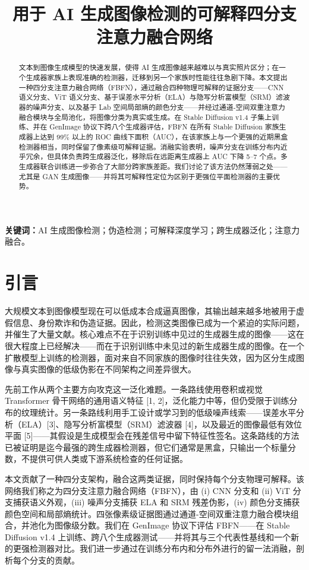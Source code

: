 \documentclass[11pt]{ctexart}
\title{\bfseries 用于 AI 生成图像检测的可解释四分支注意力融合网络}
\date{}
\begin{document}
\maketitle

\begin{abstract}
文本到图像生成模型的快速发展，使得 AI 生成图像越来越难以与真实照片区分；在一个生成器家族上表现准确的检测器，迁移到另一个家族时性能往往急剧下降。本文提出一种四分支注意力融合网络（FBFN），通过融合四种物理可解释的证据分支——CNN 语义分支、ViT 语义分支、基于误差水平分析（ELA）与隐写分析富模型（SRM）滤波器的噪声分支、以及基于 Lab 空间局部熵的颜色分支——并经过通道-空间双重注意力融合模块与全局池化，将图像分类为真实或生成。在 Stable Diffusion v1.4 子集上训练、并在 GenImage 协议下跨八个生成器评估，FBFN 在所有 Stable Diffusion 家族生成器上达到 99\% 以上的 ROC 曲线下面积（AUC），在该家族上与一个更强的近期黑盒检测器相当，同时保留了像素级可解释证据。消融实验表明，噪声分支在训练分布内近乎冗余，但具体负责跨生成器泛化，移除后在远距离生成器上 AUC 下降 5--7 个点。多生成器联合训练进一步弥合了大部分跨家族差距。我们讨论了该方法仍然薄弱之处——尤其是 GAN 生成图像——并将其可解释性定位为区别于更强位平面检测器的主要优势。
\end{abstract}

\noindent\textbf{关键词：}AI 生成图像检测；伪造检测；可解释深度学习；跨生成器泛化；注意力融合。

\section{引言}

大规模文本到图像模型现在可以低成本合成逼真图像，其输出越来越多地被用于虚假信息、身份欺诈和伪造证据。因此，检测这类图像已成为一个紧迫的实际问题，并催生了大量文献。核心难点不在于识别训练中见过的生成器生成的图像——这在很大程度上已经解决——而在于识别训练中未见过的新生成器生成的图像。在一个扩散模型上训练的检测器，面对来自不同家族的图像时往往失效，因为区分生成图像与真实图像的低级伪影在不同架构之间差异很大。

先前工作从两个主要方向攻克这一泛化难题。一条路线使用卷积或视觉 Transformer 骨干网络的通用语义特征 [1, 2]，泛化能力中等，但仍受限于训练分布的纹理统计。另一条路线利用手工设计或学习到的低级噪声线索——误差水平分析（ELA）[3]、隐写分析富模型（SRM）滤波器 [4]，以及最近的图像最低有效位平面 [5]——其假设是生成模型会在残差信号中留下特征性签名。这条路线的方法已被证明是迄今最强的跨生成器检测器，但它们通常是黑盒，只输出一个标量分数，不提供可供人类或下游系统检查的任何证据。

本文贡献了一种四分支架构，融合这两类证据，同时保持每个分支物理可解释。该网络我们称之为四分支注意力融合网络（FBFN），由 (i) CNN 分支和 (ii) ViT 分支捕获语义外观，(iii) 噪声分支捕获 ELA 和 SRM 残差伪影，(iv) 颜色分支捕获颜色空间和局部熵统计。四张像素级证据图通过通道-空间双重注意力融合模块组合，并池化为图像级分数。我们在 GenImage 协议下评估 FBFN——在 Stable Diffusion v1.4 上训练、跨八个生成器测试——并将其与三个代表性基线和一个新的更强检测器对比。我们进一步通过在训练分布内和分布外进行的留一法消融，剖析每个分支的贡献。
\end{document}
